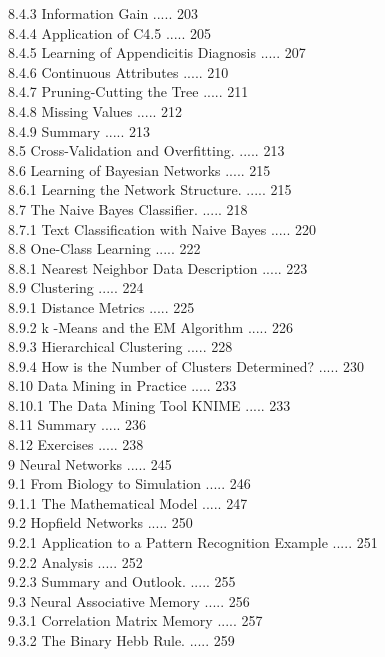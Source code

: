 \documentclass[10pt]{article}
\begin{document}
8.4.3 Information Gain ..... 203\\
8.4.4 Application of C4.5 ..... 205\\
8.4.5 Learning of Appendicitis Diagnosis ..... 207\\
8.4.6 Continuous Attributes ..... 210\\
8.4.7 Pruning-Cutting the Tree ..... 211\\
8.4.8 Missing Values ..... 212\\
8.4.9 Summary ..... 213\\
8.5 Cross-Validation and Overfitting. ..... 213\\
8.6 Learning of Bayesian Networks ..... 215\\
8.6.1 Learning the Network Structure. ..... 215\\
8.7 The Naive Bayes Classifier. ..... 218\\
8.7.1 Text Classification with Naive Bayes ..... 220\\
8.8 One-Class Learning ..... 222\\
8.8.1 Nearest Neighbor Data Description ..... 223\\
8.9 Clustering ..... 224\\
8.9.1 Distance Metrics ..... 225\\
8.9.2 k -Means and the EM Algorithm ..... 226\\
8.9.3 Hierarchical Clustering ..... 228\\
8.9.4 How is the Number of Clusters Determined? ..... 230\\
8.10 Data Mining in Practice ..... 233\\
8.10.1 The Data Mining Tool KNIME ..... 233\\
8.11 Summary ..... 236\\
8.12 Exercises ..... 238\\
9 Neural Networks ..... 245\\
9.1 From Biology to Simulation ..... 246\\
9.1.1 The Mathematical Model ..... 247\\
9.2 Hopfield Networks ..... 250\\
9.2.1 Application to a Pattern Recognition Example ..... 251\\
9.2.2 Analysis ..... 252\\
9.2.3 Summary and Outlook. ..... 255\\
9.3 Neural Associative Memory ..... 256\\
9.3.1 Correlation Matrix Memory ..... 257\\
9.3.2 The Binary Hebb Rule. ..... 259\\
\end{document}
